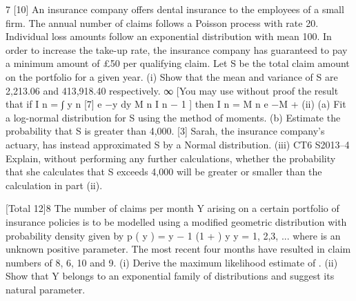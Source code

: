 7
[10]
An insurance company offers dental insurance to the employees of a small firm. The
annual number of claims follows a Poisson process with rate 20. Individual loss
amounts follow an exponential distribution with mean 100. In order to increase the
take-up rate, the insurance company has guaranteed to pay a minimum amount of £50
per qualifying claim. Let S be the total claim amount on the portfolio for a given
year.
(i)
Show that the mean and variance of S are 2,213.06 and 413,918.40
respectively.
∞
[You may use without proof the result that if I n =
∫ y
n
[7]
\lambda e −\lambda y dy
M
n
I n − 1 ]
\lambda
then I n = M n e −\lambda M +
(ii) (a) Fit a log-normal distribution for S using the method of moments.
(b) Estimate the probability that S is greater than 4,000.
[3]
Sarah, the insurance company’s actuary, has instead approximated S by a Normal
distribution.
(iii)
CT6 S2013–4
Explain, without performing any further calculations, whether the probability
that she calculates that S exceeds 4,000 will be greater or smaller than the
calculation in part (ii).

[Total 12]8
The number of claims per month Y arising on a certain portfolio of insurance policies
is to be modelled using a modified geometric distribution with probability density
given by
p ( y \alpha ) =
\alpha y − 1
(1 + \alpha ) y
y = 1, 2,3, ...
where \alpha is an unknown positive parameter. The most recent four months have
resulted in claim numbers of 8, 6, 10 and 9.
(i) Derive the maximum likelihood estimate of \alpha .
(ii) Show that Y belongs to an exponential family of distributions and suggest its
natural parameter.


\newpage

